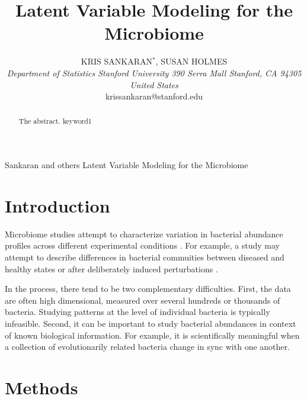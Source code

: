 \documentclass[oupdraft]{bio}
\begin{document}
\title{Latent Variable Modeling for the Microbiome}

\author{
  KRIS SANKARAN$^\ast$, SUSAN HOLMES\\[4pt]
  \textit{
    Department of Statistics
    Stanford University
    390 Serra Mall
    Stanford, CA 94305
    United States
  } \\[2pt]
  {krissankaran@stanford.edu}
}

\markboth
{Sankaran and others}
{Latent Variable Modeling for the Microbiome}

\maketitle


\begin{abstract}
  {
    The abstract.
  }
  {
    keyword1
  }
\end{abstract}

\section{Introduction}

Microbiome studies attempt to characterize variation in bacterial
abundance profiles across different experimental conditions
\citep{human2012structure}. For example, a study may attempt to describe differences
in bacterial commuities between diseased and healthy states or after
deliberately induced perturbations \citep{dethlefsen2011incomplete}.

In the process, there tend to be two complementary difficulties. First, the data
are often high dimensional, measured over several hundreds or thousands of
bacteria. Studying patterns at the level of individual bacteria is typically
infeasible. Second, it can be important to study bacterial abundances in context
of known biological information. For example, it is scientifically meaningful
when a collection of evolutionarily related bacteria change in sync with one
another.

\section{Methods}
\end{document}
